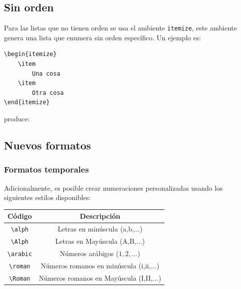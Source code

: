 \documentclass[a4,10pt]{aleph-notas}
\begin{document}
\subsection{Sin orden}

Para las listas que no tienen orden se usa el ambiente \verb"itemize", este ambiente genera una lista que enumera sin orden específico. Un ejemplo es:

\begin{lstlisting}[frame=single]
\begin{itemize}
    \item 
        Una cosa
    \item 
        Otra cosa
\end{itemize}
\end{lstlisting}

produce:

\begin{center}
{ \fboxsep 12pt
 }
\end{center}

\subsection{Nuevos formatos}

\subsubsection{Formatos temporales}

Adicionalmente, es posible crear numeraciones personalizadas usando los siguientes estilos disponibles:

\begin{center}
    \begin{tabular}{c|c}
        Código & Descripción \\
        \hline
        \verb"\alph" & Letras en minúscula (a,b,$\ldots$)\\ 
        \verb"\Alph" & Letras en Mayúscula (A,B,$\ldots$)\\
        \verb"\arabic" & Números arábigos ($1,2,\ldots$)\\
        \verb"\roman" & Números romanos en minúscula (i,ii,$\ldots$)\\
        \verb"\Roman"   & Números romanos en Mayúscula (I,II,$\ldots$)
    \end{tabular}
\end{center}
\end{document}
